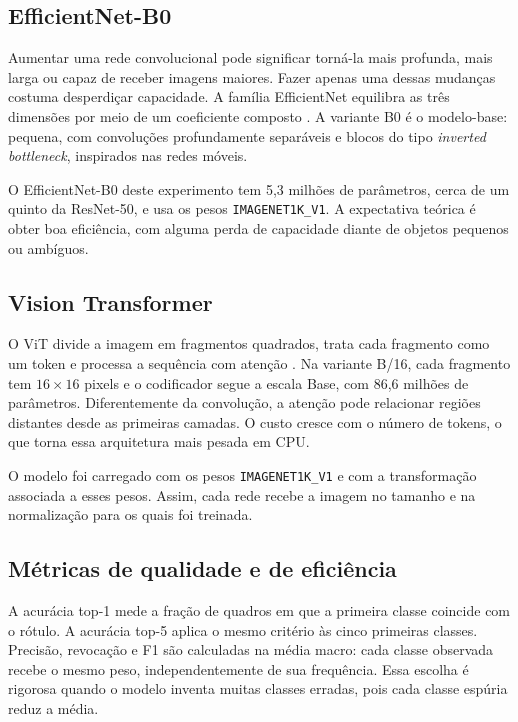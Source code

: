 \documentclass[12pt,a4paper]{article}
\begin{document}
\subsection{EfficientNet-B0}

Aumentar uma rede convolucional pode significar torná-la mais profunda, mais larga ou
capaz de receber imagens maiores. Fazer apenas uma dessas mudanças costuma desperdiçar
capacidade. A família EfficientNet equilibra as três dimensões por meio de um coeficiente
composto \cite{tan2019}. A variante B0 é o modelo-base: pequena, com convoluções
profundamente separáveis e blocos do tipo \emph{inverted bottleneck}, inspirados nas
redes móveis.

O EfficientNet-B0 deste experimento tem 5,3 milhões de parâmetros, cerca de um quinto
da ResNet-50, e usa os pesos \texttt{IMAGENET1K\_V1}. A expectativa teórica é obter
boa eficiência, com alguma perda de capacidade diante de objetos pequenos ou ambíguos.

\subsection{Vision Transformer}

O ViT divide a imagem em fragmentos quadrados, trata cada fragmento como um token e
processa a sequência com atenção \cite{dosovitskiy2021}. Na variante B/16, cada
fragmento tem \(16 \times 16\) pixels e o codificador segue a escala Base, com
86,6 milhões de parâmetros. Diferentemente da convolução, a atenção pode relacionar
regiões distantes desde as primeiras camadas. O custo cresce com o número de tokens,
o que torna essa arquitetura mais pesada em CPU.

O modelo foi carregado com os pesos \texttt{IMAGENET1K\_V1} e com a transformação
associada a esses pesos. Assim, cada rede recebe a imagem no tamanho e na normalização
para os quais foi treinada.

\subsection{Métricas de qualidade e de eficiência}

A acurácia top-1 mede a fração de quadros em que a primeira classe coincide com o
rótulo. A acurácia top-5 aplica o mesmo critério às cinco primeiras classes.
Precisão, revocação e F1 são calculadas na média macro: cada classe observada recebe
o mesmo peso, independentemente de sua frequência. Essa escolha é rigorosa quando o
modelo inventa muitas classes erradas, pois cada classe espúria reduz a média.
\end{document}
